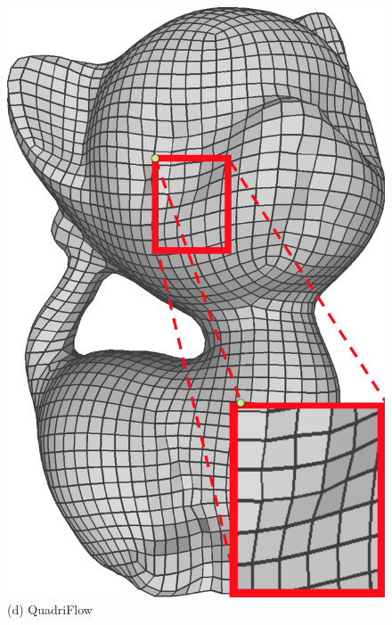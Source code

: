 \begin{figure}
\begin{minipage}{0.16\textwidth}
  \includegraphics[width=\textwidth,height=1.33\textwidth]{quadriflow/result/area03.png}\\
   (d) QuadriFlow
   \end{minipage}
    \begin{minipage}{0.16\textwidth}
 	\centering

\end{minipage}
\end{figure}

